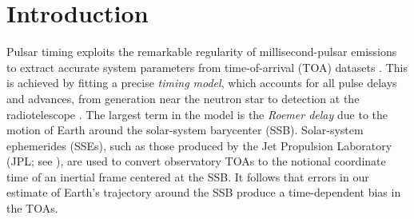 \documentclass[reprint,
 amsmath,amssymb,
 aps,prd,floatfix,
]{revtex4-1}
\begin{document}

\maketitle


\section{Introduction}
\label{sec:intro}

Pulsar timing exploits the remarkable regularity of millisecond-pulsar emissions to extract accurate system parameters from time-of-arrival (TOA) datasets \cite{2012hpa..book.....L}.
This is achieved by fitting a precise \emph{timing model}, which accounts for all pulse delays and advances, from generation near the neutron star to detection at the radiotelescope \cite{2013CQGra..30v4001L}.
The largest term in the model is the \emph{Roemer delay} \cite{roemer1676} due to the motion of Earth around the solar-system barycenter (SSB). Solar-system ephemerides (SSEs), such as those produced by the Jet Propulsion Laboratory (JPL; see \cite{2009IPNPR.178C...1F,2014IPNPR.196C...1F,de435,de436,de438}), are used to convert observatory TOAs to the notional coordinate time of an inertial frame centered at the SSB.
It follows that errors in our estimate of Earth's trajectory around the SSB produce a time-dependent bias in the TOAs.
\end{document}
